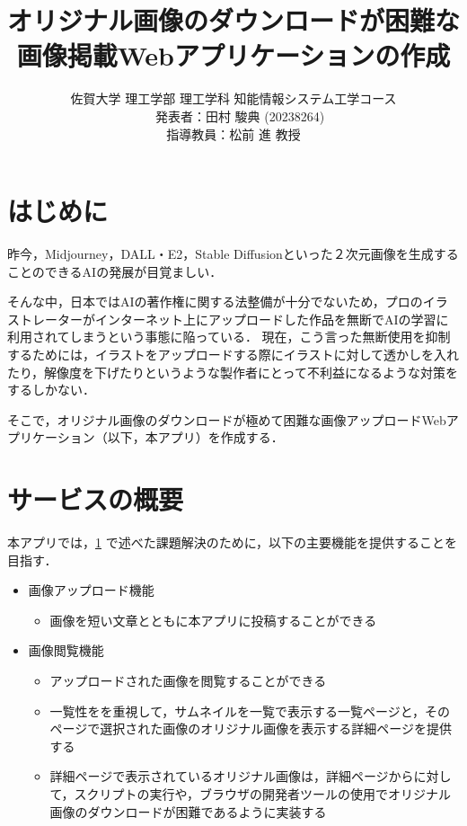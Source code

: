 ﻿\documentclass[twocolumn,a4j]{jarticle}
\title{
  オリジナル画像のダウンロードが困難な\\画像掲載Webアプリケーションの作成
}
\author{
  佐賀大学 理工学部 理工学科 知能情報システム工学コース\\
  　発表者：田村 駿典 (20238264)\\
  指導教員：松前 進 教授
}
\begin{document}
\date{\empty}
\maketitle
\thispagestyle{empty}

\section{はじめに}\label{sec:sec1}

昨今，Midjourney，DALL・E2，Stable Diffusionといった２次元画像を生成することのできるAIの発展が目覚ましい．\par
そんな中，日本ではAIの著作権に関する法整備が十分でないため，プロのイラストレーターがインターネット上にアップロードした作品を無断でAIの学習に利用されてしまうという事態に陥っている\cite{nhk}．
現在，こう言った無断使用を抑制するためには，イラストをアップロードする際にイラストに対して透かしを入れたり，解像度を下げたりというような製作者にとって不利益になるような対策をするしかない．\par
そこで，オリジナル画像のダウンロードが極めて困難な画像アップロードWebアプリケーション（以下，本アプリ）を作成する．



\section{サービスの概要}
本アプリでは，\ref{sec:sec1} で述べた課題解決のために，以下の主要機能を提供することを目指す．
\begin{itemize}
  \item 画像アップロード機能
        \setlength{\parskip}{0cm}
        \begin{itemize}
          \item 画像を短い文章とともに本アプリに投稿することができる
        \end{itemize}
  \item 画像閲覧機能
        \begin{itemize}
          \item アップロードされた画像を閲覧することができる
          \item 一覧性をを重視して，サムネイルを一覧で表示する一覧ページと，そのページで選択された画像のオリジナル画像を表示する詳細ページを提供する
          \item 詳細ページで表示されているオリジナル画像は，詳細ページからに対して，スクリプトの実行や，ブラウザの開発者ツールの使用でオリジナル画像のダウンロードが困難であるように実装する
        \end{itemize}
\end{itemize}
\end{document}
